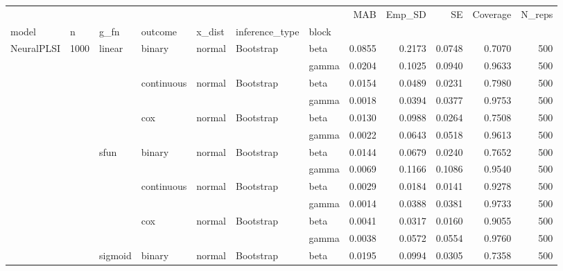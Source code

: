 \begin{tabular}{lllllllrrrrr}
\toprule
 &  &  &  &  &  &  & MAB & Emp_SD & SE & Coverage & N_reps \\
model & n & g_fn & outcome & x_dist & inference_type & block &  &  &  &  &  \\
\midrule
\multirow[t]{36}{*}{NeuralPLSI} & \multirow[t]{18}{*}{1000} & \multirow[t]{6}{*}{linear} & \multirow[t]{2}{*}{binary} & \multirow[t]{2}{*}{normal} & \multirow[t]{2}{*}{Bootstrap} & beta & 0.0855 & 0.2173 & 0.0748 & 0.7070 & 500 \\
 &  &  &  &  &  & gamma & 0.0204 & 0.1025 & 0.0940 & 0.9633 & 500 \\
\cline{4-12} \cline{5-12} \cline{6-12}
 &  &  & \multirow[t]{2}{*}{continuous} & \multirow[t]{2}{*}{normal} & \multirow[t]{2}{*}{Bootstrap} & beta & 0.0154 & 0.0489 & 0.0231 & 0.7980 & 500 \\
 &  &  &  &  &  & gamma & 0.0018 & 0.0394 & 0.0377 & 0.9753 & 500 \\
\cline{4-12} \cline{5-12} \cline{6-12}
 &  &  & \multirow[t]{2}{*}{cox} & \multirow[t]{2}{*}{normal} & \multirow[t]{2}{*}{Bootstrap} & beta & 0.0130 & 0.0988 & 0.0264 & 0.7508 & 500 \\
 &  &  &  &  &  & gamma & 0.0022 & 0.0643 & 0.0518 & 0.9613 & 500 \\
\cline{3-12} \cline{4-12} \cline{5-12} \cline{6-12}
 &  & \multirow[t]{6}{*}{sfun} & \multirow[t]{2}{*}{binary} & \multirow[t]{2}{*}{normal} & \multirow[t]{2}{*}{Bootstrap} & beta & 0.0144 & 0.0679 & 0.0240 & 0.7652 & 500 \\
 &  &  &  &  &  & gamma & 0.0069 & 0.1166 & 0.1086 & 0.9540 & 500 \\
\cline{4-12} \cline{5-12} \cline{6-12}
 &  &  & \multirow[t]{2}{*}{continuous} & \multirow[t]{2}{*}{normal} & \multirow[t]{2}{*}{Bootstrap} & beta & 0.0029 & 0.0184 & 0.0141 & 0.9278 & 500 \\
 &  &  &  &  &  & gamma & 0.0014 & 0.0388 & 0.0381 & 0.9733 & 500 \\
\cline{4-12} \cline{5-12} \cline{6-12}
 &  &  & \multirow[t]{2}{*}{cox} & \multirow[t]{2}{*}{normal} & \multirow[t]{2}{*}{Bootstrap} & beta & 0.0041 & 0.0317 & 0.0160 & 0.9055 & 500 \\
 &  &  &  &  &  & gamma & 0.0038 & 0.0572 & 0.0554 & 0.9760 & 500 \\
\cline{3-12} \cline{4-12} \cline{5-12} \cline{6-12}
 &  & \multirow[t]{6}{*}{sigmoid} & \multirow[t]{2}{*}{binary} & \multirow[t]{2}{*}{normal} & \multirow[t]{2}{*}{Bootstrap} & beta & 0.0195 & 0.0994 & 0.0305 & 0.7358 & 500 \\

\end{tabular}
